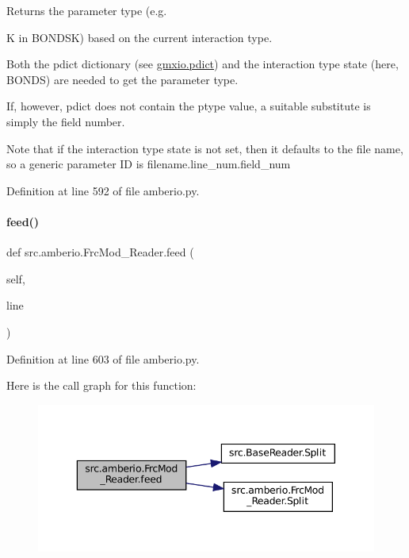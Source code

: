 Returns the parameter type (e.\+g. 

K in B\+O\+N\+D\+SK) based on the current interaction type.

Both the \textquotesingle{}pdict\textquotesingle{} dictionary (see \hyperlink{namespacesrc_1_1gmxio_ad55e036d51846e3440a373c57439dffa}{gmxio.\+pdict}) and the interaction type \textquotesingle{}state\textquotesingle{} (here, B\+O\+N\+DS) are needed to get the parameter type.

If, however, \textquotesingle{}pdict\textquotesingle{} does not contain the ptype value, a suitable substitute is simply the field number.

Note that if the interaction type state is not set, then it defaults to the file name, so a generic parameter ID is \textquotesingle{}filename.\+line\+\_\+num.\+field\+\_\+num\textquotesingle{} 

Definition at line 592 of file amberio.\+py.

\mbox{\label{classsrc_1_1amberio_1_1FrcMod__Reader_af04da824acce802babb9dca8efc01468}} 
\paragraph{\texorpdfstring{feed()}{feed()}}
{\footnotesize\ttfamily def src.\+amberio.\+Frc\+Mod\+\_\+\+Reader.\+feed (\begin{DoxyParamCaption}\item[{}]{self,  }\item[{}]{line }\end{DoxyParamCaption})}



Definition at line 603 of file amberio.\+py.

Here is the call graph for this function\+:
\nopagebreak
\begin{figure}[H]
\begin{center}
\leavevmode
\includegraphics[width=343pt]{classsrc_1_1amberio_1_1FrcMod__Reader_af04da824acce802babb9dca8efc01468_cgraph}
\end{center}
\end{figure}
\mbox{\label{classsrc_1_1amberio_1_1FrcMod__Reader_ab518c55f9e66b28b63cdda98b8cc0326}} 
